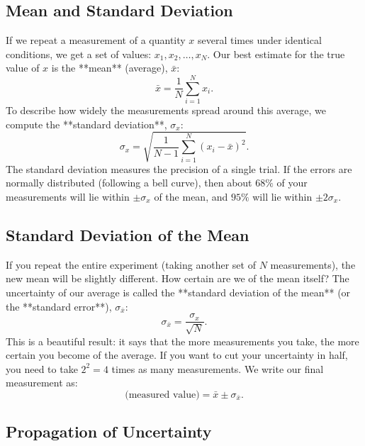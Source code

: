 \subsection{Mean and Standard Deviation}

If we repeat a measurement of a quantity $x$ several times under identical conditions, we get a set of values: $x_1, x_2, \dots, x_N$. Our best estimate for the true value of $x$ is the **mean** (average), $\bar{x}$:
\begin{equation}
    \bar{x} = \frac{1}{N}\sum_{i=1}^{N} x_i.
\end{equation}
To describe how widely the measurements spread around this average, we compute the **standard deviation**, $\sigma_x$:
\begin{equation}
    \sigma_x = \sqrt{\frac{1}{N-1}\sum_{i=1}^{N} (x_i - \bar{x})^2}.
\end{equation}
The standard deviation measures the precision of a single trial. If the errors are normally distributed (following a bell curve), then about $68\%$ of your measurements will lie within $\pm \sigma_x$ of the mean, and $95\%$ will lie within $\pm 2\sigma_x$.

\subsection{Standard Deviation of the Mean}

If you repeat the entire experiment (taking another set of $N$ measurements), the new mean will be slightly different. How certain are we of the mean itself? The uncertainty of our average is called the **standard deviation of the mean** (or the **standard error**), $\sigma_{\bar{x}}$:
\begin{equation}
    \sigma_{\bar{x}} = \frac{\sigma_x}{\sqrt{N}}.
\end{equation}
This is a beautiful result: it says that the more measurements you take, the more certain you become of the average. If you want to cut your uncertainty in half, you need to take $2^2 = 4$ times as many measurements. We write our final measurement as:
\begin{equation}
    \text{(measured value)} = \bar{x} \pm \sigma_{\bar{x}}.
\end{equation}

\subsection{Propagation of Uncertainty}

